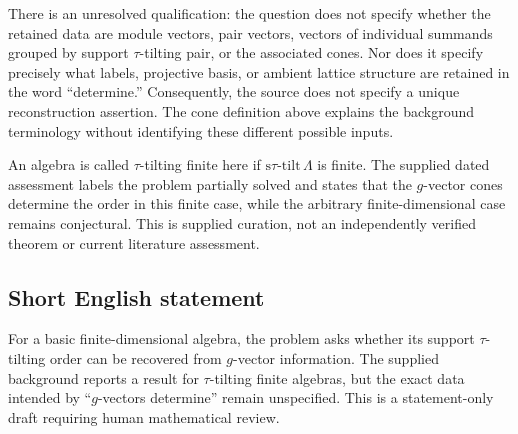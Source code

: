 \documentclass[11pt]{article}
\begin{document}
There is an unresolved qualification: the question does not specify whether the retained data are module vectors, pair vectors, vectors of individual summands grouped by support \(\tau\)-tilting pair, or the associated cones. Nor does it specify precisely what labels, projective basis, or ambient lattice structure are retained in the word ``determine.'' Consequently, the source does not specify a unique reconstruction assertion. The cone definition above explains the background terminology without identifying these different possible inputs.

An algebra is called \(\tau\)-tilting finite here if \(\mathrm{s}\tau\text{-}\mathrm{tilt}\,\Lambda\) is finite. The supplied dated assessment labels the problem partially solved and states that the \(g\)-vector cones determine the order in this finite case, while the arbitrary finite-dimensional case remains conjectural. This is supplied curation, not an independently verified theorem or current literature assessment.
\subsection{Short English statement}
For a basic finite-dimensional algebra, the problem asks whether its support \(\tau\)-tilting order can be recovered from \(g\)-vector information. The supplied background reports a result for \(\tau\)-tilting finite algebras, but the exact data intended by ``\(g\)-vectors determine'' remain unspecified. This is a statement-only draft requiring human mathematical review.
\end{document}
